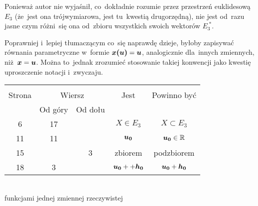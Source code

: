 \documentclass[a4paper,11pt]{article}
\begin{document}
\start {} Ponieważ autor nie wyjaśnił, co~dokładnie rozumie przez
przestrzeń euklidesową $E_{ 3 }$ (że~jest ona trójwymiarowa, jest
tu~kwestią drugorzędną), nie jest od~razu jasne czym różni~się ona
od~zbioru wszystkich swoich wektorów $E_{ 3 }^{ \;* }$.

\vspace{\spaceFour}


\start {} Poprawniej i~lepiej tłumaczącym co~się naprawdę dzieje,
byłoby zapisywać równania parametryczne w~formie
$\boldsymbol{x( u )} = \boldsymbol{u}$, analogicznie dla~innych zmiennych,
niż~$\boldsymbol{x} = \boldsymbol{u}$. Można to~jednak zrozumieć stosowanie takiej
konwencji jako kwestię uproszczenie notacji i~zwyczaju.

\vspace{\spaceFour}


\begin{center}
  \begin{tabular}{|c|c|c|c|c|}
    \hline
    & \multicolumn{2}{c|}{} & & \\
    Strona & \multicolumn{2}{c|}{Wiersz} & Jest
                              & Powinno być \\ \cline{2-3}
    & Od góry & Od dołu & & \\
    \hline
    6   & 17 & & $X \in E_{ 3 }$ & $X \subset E_{ 3 }$ \\
    11  & 11 & & $\boldsymbol{u_{ 0 }}$ & $\boldsymbol{u_{ 0 }} \in \mathbb{R}$ \\
    15  & &  3 & zbiorem & podzbiorem \\
    18  &  3 & & $\boldsymbol{u_{ 0 }} + + \boldsymbol{h_{ 0 }}$
           & $\boldsymbol{u_{ 0 }} + \boldsymbol{h_{ 0 }}$ \\
    \hline
  \end{tabular}
\end{center}
\noi
{} \\
\Jest funkcjami jednej zmiennej rzeczywistej \\
\Pow {} \\

\vspace{\spaceTwo}
\end{document}
